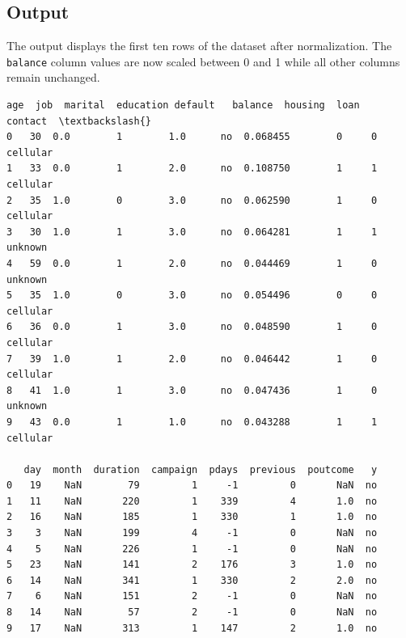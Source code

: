 \documentclass[11pt,a4paper]{report}
\makeatletter
\newcommand{\boxspacing}{\kern\kvtcb@left@rule\kern\kvtcb@boxsep}
\newcommand{\prompt}[4]{
        {\ttfamily\llap{{\color{#2}[#3]:\hspace{3pt}#4}}\vspace{-\baselineskip}}
    }
\makeatother
\begin{document}
\subsection*{Output}
The output displays the first ten rows of the dataset after normalization. The \texttt{balance} column values are now scaled between 0 and 1 while all other columns remain unchanged.
            \begin{tcolorbox}[breakable, size=fbox, boxrule=.5pt, pad at break*=1mm, opacityfill=0]
\prompt{Out}{outcolor}{16}{\boxspacing}
\begin{Verbatim}[commandchars=\\\{\}]
   age  job  marital  education default   balance  housing  loan   contact  \textbackslash{}
0   30  0.0        1        1.0      no  0.068455        0     0  cellular
1   33  0.0        1        2.0      no  0.108750        1     1  cellular
2   35  1.0        0        3.0      no  0.062590        1     0  cellular
3   30  1.0        1        3.0      no  0.064281        1     1   unknown
4   59  0.0        1        2.0      no  0.044469        1     0   unknown
5   35  1.0        0        3.0      no  0.054496        0     0  cellular
6   36  0.0        1        3.0      no  0.048590        1     0  cellular
7   39  1.0        1        2.0      no  0.046442        1     0  cellular
8   41  1.0        1        3.0      no  0.047436        1     0   unknown
9   43  0.0        1        1.0      no  0.043288        1     1  cellular

   day  month  duration  campaign  pdays  previous  poutcome   y
0   19    NaN        79         1     -1         0       NaN  no
1   11    NaN       220         1    339         4       1.0  no
2   16    NaN       185         1    330         1       1.0  no
3    3    NaN       199         4     -1         0       NaN  no
4    5    NaN       226         1     -1         0       NaN  no
5   23    NaN       141         2    176         3       1.0  no
6   14    NaN       341         1    330         2       2.0  no
7    6    NaN       151         2     -1         0       NaN  no
8   14    NaN        57         2     -1         0       NaN  no
9   17    NaN       313         1    147         2       1.0  no
\end{Verbatim}
\end{tcolorbox}
        
        
        
\end{document}
